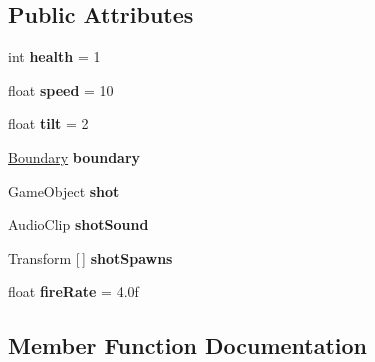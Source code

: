 \subsection*{Public Attributes}
\begin{DoxyCompactItemize}
\item 
\mbox{\label{class_player_controller_a7816d8bf32a9641bd6be9dcd3fcb188a}} 
int {\bfseries health} = 1
\item 
\mbox{\label{class_player_controller_a0928605583f0563cd84fe43119d336ec}} 
float {\bfseries speed} = 10
\item 
\mbox{\label{class_player_controller_ac3e62babe8d87ccdfc0216fac5fe1688}} 
float {\bfseries tilt} = 2
\item 
\mbox{\label{class_player_controller_a246c2caafdd1c1fd28d6c1c11a553f77}} 
\mbox{\hyperlink{class_boundary}{Boundary}} {\bfseries boundary}
\item 
\mbox{\label{class_player_controller_ab4e097e87d1e1fd90c0874c9949e0b51}} 
Game\+Object {\bfseries shot}
\item 
\mbox{\label{class_player_controller_a8dc27fe958c8056b075693cfc02fdae3}} 
Audio\+Clip {\bfseries shot\+Sound}
\item 
\mbox{\label{class_player_controller_a721f59742cc9c01ffd623af9dcef111a}} 
Transform \mbox{[}$\,$\mbox{]} {\bfseries shot\+Spawns}
\item 
\mbox{\label{class_player_controller_aec1e8f25c69ea198fe38f965307437a4}} 
float {\bfseries fire\+Rate} = 4.\+0f
\end{DoxyCompactItemize}


\subsection{Member Function Documentation}
\mbox{\label{class_player_controller_aec106145be8e43f9367dd27bd79cbb4b}} 
